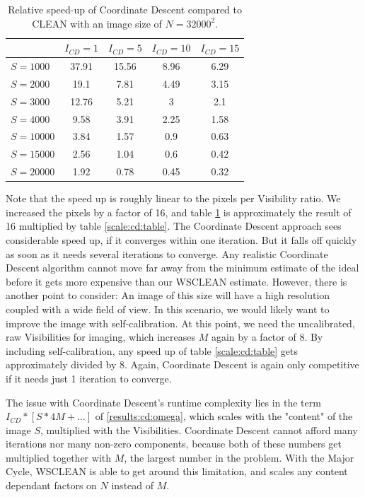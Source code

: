\begin{table}[h!]
	\begin{center}
		\begin{tabular}{l|c|c|c|c} %
			& $I_{CD} = 1$ & $I_{CD} = 5$ &  $I_{CD} = 10$ &  $I_{CD} = 15$\\
			\hline
			$S=1000$ & 37.91 & 15.56 & 8.96 & 6.29 \\
			$S=2000$ & 19.1 & 7.81 & 4.49 & 3.15  \\
			$S=3000$ & 12.76 & 5.21 & 3 & 2.1  \\
			$S=4000$ & 9.58 & 3.91 & 2.25 & 1.58 \\
			\hline
			$S=10000$ & 3.84 & 1.57 & 0.9 & 0.63  \\
			$S=15000$ & 2.56 & 1.04 & 0.6 & 0.42\\
			$S=20000$ & 1.92 & 0.78 & 0.45 & 0.32 \\
		\end{tabular}
		\caption{Relative speed-up of Coordinate Descent compared to CLEAN with an image size of $N=32000^2$. }
		\label{res:cd:large:table}
	\end{center}
\end{table}

Note that the speed up is roughly linear to the pixels per Visibility ratio. We increased the pixels by a factor of 16, and table \ref{res:cd:large:table} is approximately the result of 16 multiplied by table \ref{scale:cd:table}. The Coordinate Descent approach sees considerable speed up, if it converges within one iteration. But it falls off quickly as soon as it needs several iterations to converge. Any realistic Coordinate Descent algorithm cannot move far away from the minimum estimate of the ideal before it gets more expensive than our WSCLEAN estimate. However, there is another point to consider: An image of this size will have a high resolution coupled with a wide field of view. In this scenario, we would likely want to improve the image with self-calibration. At this point, we need the uncalibrated, raw Visibilities for imaging, which increases $M$ again by a factor of 8. By including self-calibration, any speed up of table \ref{scale:cd:table} gets approximately divided by 8. Again, Coordinate Descent is again only competitive if it needs just 1 iteration to converge.  

The issue with Coordinate Descent's runtime complexity lies in the term $I_{CD} * [S * 4M +\ldots]$ of \eqref{results:cd:omega}, which scales with the "content" of the image $S$, multiplied with the Visibilities. Coordinate Descent cannot afford many iterations nor many non-zero components, because both of these numbers get multiplied together with $M$, the largest number in the problem. With the Major Cycle, WSCLEAN is able to get around this limitation, and scales any content dependant factors on $N$ instead of $M$. 

